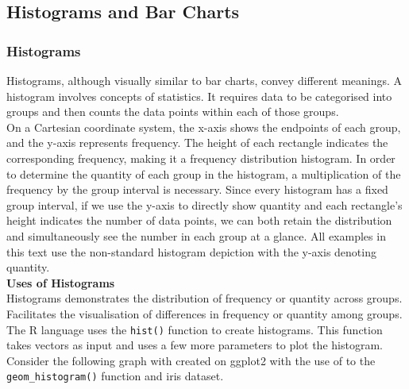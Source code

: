 \documentclass{article}\usepackage[]{graphicx}\usepackage[]{xcolor}
\begin{document}
\subsection{ Histograms and Bar Charts }
\subsubsection{Histograms}

Histograms, although visually similar to bar charts, convey different meanings. A histogram involves concepts of statistics. It requires data to be categorised into groups and then counts the data points within each of those groups.\\

\noindent On a Cartesian coordinate system, the x-axis shows the endpoints of each group, and the y-axis represents frequency. The height of each rectangle indicates the corresponding frequency, making it a frequency distribution histogram. In order to determine the quantity of each group in the histogram, a multiplication of the frequency by the group interval is necessary. Since every histogram has a fixed group interval, if we use the y-axis to directly show quantity and each rectangle's height indicates the number of data points, we can both retain the distribution and simultaneously see the number in each group at a glance. All examples in this text use the non-standard histogram depiction with the y-axis denoting quantity.\\

\noindent
\textbf{Uses of Histograms}\\
\noindent Histograms demonstrates the distribution of frequency or quantity across groups. Facilitates the visualisation of differences in frequency or quantity among groups. The R language uses the \texttt{hist()} function to create histograms. This function takes vectors as input and uses a few more parameters to plot the histogram.\\

\noindent
Consider the following graph with created on ggplot2 with the use of to the \texttt{geom\_histogram()} function and iris dataset.
\end{document}
